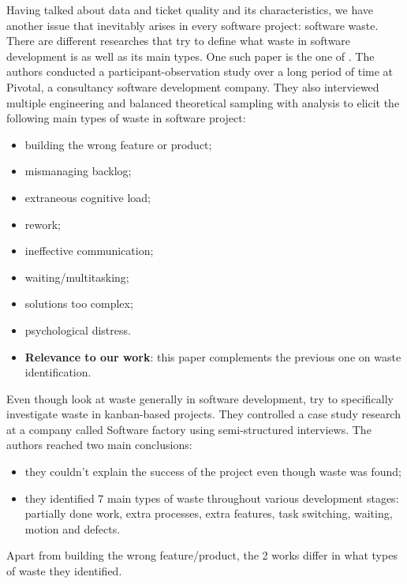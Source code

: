 \documentclass{mprop}
\begin{document}
Having talked about data and ticket quality and its characteristics, we have 
another issue that inevitably arises in every software project: software waste. 
There are different researches that try to define what waste in software 
development is as well as its main types. One such paper is the one of 
\citet{sedano2017software}. The authors conducted a participant-observation 
study over a long period of time at Pivotal, a consultancy software development
company. They also interviewed multiple engineering and balanced theoretical 
sampling with analysis to elicit the following main types of waste in software
project:
  \begin{itemize}
    \item building the wrong feature or product;
    \item mismanaging backlog;
    \item extraneous cognitive load;
    \item rework;
    \item ineffective communication;
    \item waiting/multitasking;
    \item solutions too complex;
    \item psychological distress.
    \item \textbf{Relevance to our work}: this paper complements the previous 
      one on waste identification\cite{Korkala2014WasteIdentification}.
  \end{itemize}

Even though \citet{sedano2017software} look at waste generally in software 
development, \citet{ikonen2010exploring} try to specifically investigate waste
in kanban-based projects. They controlled a case study research at a company 
called Software factory using semi-structured interviews. The authors reached
two main conclusions:
  \begin{itemize}
    \item they couldn't explain the success of the project even though waste was 
      found;
    \item they identified 7 main types of waste throughout various development
      stages: partially done work, extra processes, extra features, task 
      switching, waiting, motion and defects.
  \end{itemize}
Apart from building the wrong feature/product, the 2 works differ in what types
of waste they identified.
\end{document}
